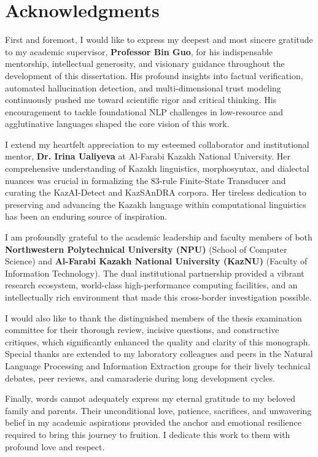 \chapter*{Acknowledgments}

First and foremost, I would like to express my deepest and most sincere gratitude to my academic supervisor, \textbf{Professor Bin Guo}, for his indispensable mentorship, intellectual generosity, and visionary guidance throughout the development of this dissertation. His profound insights into factual verification, automated hallucination detection, and multi-dimensional trust modeling continuously pushed me toward scientific rigor and critical thinking. His encouragement to tackle foundational NLP challenges in low-resource and agglutinative languages shaped the core vision of this work.

I extend my heartfelt appreciation to my esteemed collaborator and institutional mentor, \textbf{Dr. Irina Ualiyeva} at Al-Farabi Kazakh National University. Her comprehensive understanding of Kazakh linguistics, morphosyntax, and dialectal nuances was crucial in formalizing the 83-rule Finite-State Transducer and curating the KazAI-Detect and KazSAnDRA corpora. Her tireless dedication to preserving and advancing the Kazakh language within computational linguistics has been an enduring source of inspiration.

I am profoundly grateful to the academic leadership and faculty members of both \textbf{Northwestern Polytechnical University (NPU)} (School of Computer Science) and \textbf{Al-Farabi Kazakh National University (KazNU)} (Faculty of Information Technology). The dual institutional partnership provided a vibrant research ecosystem, world-class high-performance computing facilities, and an intellectually rich environment that made this cross-border investigation possible.

I would also like to thank the distinguished members of the thesis examination committee for their thorough review, incisive questions, and constructive critiques, which significantly enhanced the quality and clarity of this monograph. Special thanks are extended to my laboratory colleagues and peers in the Natural Language Processing and Information Extraction groups for their lively technical debates, peer reviews, and camaraderie during long development cycles.

Finally, words cannot adequately express my eternal gratitude to my beloved family and parents. Their unconditional love, patience, sacrifices, and unwavering belief in my academic aspirations provided the anchor and emotional resilience required to bring this journey to fruition. I dedicate this work to them with profound love and respect.
